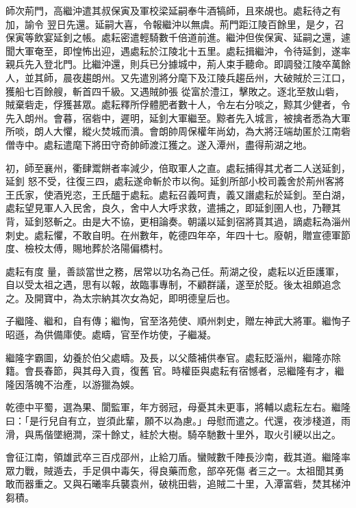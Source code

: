 \begin{pinyinscope}
 師次荊門，高繼沖遣其叔保寅及軍校梁延嗣奉牛酒犒師，且來覘也。處耘待之有加，諭令
 翌日先還。延嗣大喜，令報繼沖以無虞。荊門距江陵百餘里，是夕，召保寅等飲宴延釗之帳。處耘密遣輕騎數千倍道前進。繼沖但俟保寅、延嗣之還，遽聞大軍奄至，即惶怖出迎，遇處耘於江陵北十五里。處耘揖繼沖，令待延釗，遂率親兵先入登北門。比繼沖還，則兵已分據城中，荊人束手聽命。即調發江陵卒萬餘人，並其師，晨夜趨朗州。又先遣別將分麾下及江陵兵趨岳州，大破賊於三江口，獲船七百餘艘，斬首四千級。又遇賊帥張
 從富於澧江，擊敗之。逐北至敖山砦，賊棄砦走，俘獲甚眾。處耘釋所俘體肥者數十人，令左右分啖之，黥其少健者，令先入朗州。會暮，宿砦中，遲明，延釗大軍繼至。黥者先入城言，被擒者悉為大軍所啖，朗人大懼，縱火焚城而潰。會朗帥周保權年尚幼，為大將汪端劫匿於江南砦僧寺中。處耘遣麾下將田守奇帥師渡江獲之。遂入潭州，盡得荊湖之地。



 初，師至襄州，衢肆鬻餅者率減少，倍取軍人之直。處耘捕得其尤者二人送延釗，延釗
 怒不受，往復三四，處耘遂命斬於市以徇。延釗所部小校司義舍於荊州客將王氏家，使酒兇恣，王氏醞于處耘。處耘召義呵責，義又譖處耘於延釗。至白湖，處耘望見軍人入民舍，良久，舍中人大呼求救，遣捕之，即延釗圉人也，乃鞭其背，延釗怒斬之。由是大不協，更相論奏。朝議以延釗宿將貰其過，謫處耘為淄州刺史。處耘懼，不敢自明。在州數年，乾德四年卒，年四十七。廢朝，贈宣德軍節度、檢校太傅，賜地葬於洛陽偏橋村。



 處耘有度
 量，善談當世之務，居常以功名為己任。荊湖之役，處耘以近臣護軍，自以受太祖之遇，思有以報，故臨事專制，不顧群議，遂至於貶。後太祖頗追念之。及開寶中，為太宗納其次女為妃，即明德皇后也。



 子繼隆、繼和，自有傳；繼恂，官至洛苑使、順州刺史，贈左神武大將軍。繼恂子昭遜，為供備庫使。處疇，官至作坊使，子繼凝。



 繼隆字霸圖，幼養於伯父處疇。及長，以父蔭補供奉官。處耘貶淄州，繼隆亦除籍。會長春節，與其母入貢，復舊
 官。時權臣與處耘有宿憾者，忌繼隆有才，繼隆因落魄不治產，以游獵為娛。



 乾德中平蜀，選為果、閬監軍，年方弱冠，母憂其未更事，將輔以處耘左右。繼隆曰：「是行兒自有立，豈須此輩，願不以為慮。」母慰而遣之。代還，夜涉棧道，雨滑，與馬偕墜絕澗，深十餘丈，絓於大樹。騎卒馳數十里外，取火引綆以出之。



 會征江南，領雄武卒三百戍邵州，止給刀盾。蠻賊數千陣長沙南，截其道。繼隆率眾力戰，賊遁去，手足俱中毒矢，得良藥而愈，部卒死傷
 者三之一。太祖聞其勇敢而器重之。又與石曦率兵襲袁州，破桃田砦，追賊二十里，入潭富砦，焚其梯沖芻積。




\end{pinyinscope}
